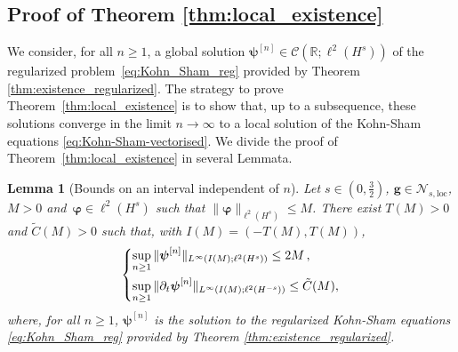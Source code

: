 \documentclass[12pt,a4paper]{amsart}
\newtheorem{lemma}[theorem]{Lemma}
\numberwithin{equation}{section}
\newcommand{\ulg}{\boldsymbol{g}}
\newcommand{\ulpsi}{\boldsymbol{\psi}}
\newcommand{\ulphi}{\boldsymbol{\varphi}}
\newcommand{\Nloc}{\mathscr{N}_{s,\mathrm{loc}}}
\begin{document}
	\subsection{Proof of Theorem \ref{thm:local_existence}}
	
	We consider, for all $n\geq1$, a global solution $ \ulpsi^{[n]} \in \mathscr{C}(\mathbb{R};\ell^2(H^{s})) $ of the regularized problem~\eqref{eq:Kohn_Sham_reg} provided by Theorem \ref{thm:existence_regularized}. The strategy to prove Theorem~\ref{thm:local_existence} is to show that, up to a subsequence, these solutions converge in the limit $ n \rightarrow \infty $ to a local solution of the Kohn-Sham equations \eqref{eq:Kohn-Sham-vectorised}. 
	We divide the proof of Theorem~\ref{thm:local_existence} in several Lemmata.
	\begin{lemma}[Bounds on an interval independent of \texorpdfstring{$n$}{n}]\label{lem:interval-indep-n}
		Let $s\in(0,\frac32)$, $\ulg\in\Nloc$, $M>0$ and~$ \ulphi  \in \ell^2(H^{s}) $ such that $ \| \ulphi  \|_{\ell^2(H^{s})} \leq M$. There exist $T(M)>0$ and $\tilde{C}(M)>0$ such that, with $I(M)=(-T(M),T(M))$,
		\begin{equation}
			\begin{dcases} \label{est:uniform_est_theorem}
				\sup_{n \geq 1} \| \ulpsi^{[n]} \|_{L^{\infty}(I(M);\ell^2(H^{s}))} \leq 2M \, , \\
				\sup_{n \geq 1} \| \partial_t \ulpsi^{[n]} \|_{L^{\infty}(I(M);\ell^2(H^{-s}))} \leq \tilde{C}(M) ,
			\end{dcases}				
		\end{equation}
		where, for all $n \geq 1$, $\ulpsi^{[n]}$ is the solution to the regularized Kohn-Sham equations \eqref{eq:Kohn_Sham_reg} provided by Theorem \ref{thm:existence_regularized}.
	\end{lemma}
\end{document}
